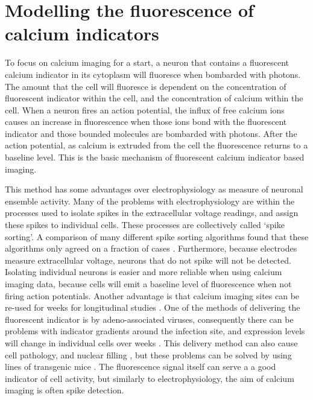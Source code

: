 \section{Modelling the fluorescence of calcium indicators}

To focus on calcium imaging for a start, a neuron that contains a fluorescent calcium indicator in its cytoplasm will fluoresce when bombarded with photons. The amount that the cell will fluoresce is dependent on the concentration of fluorescent indicator within the cell, and the concentration of calcium within the cell. When a neuron fires an action potential, the influx of free calcium ions causes an increase in fluorescence when those ions bond with the fluorescent indicator and those bounded molecules are bombarded with photons. After the action potential, as calcium is extruded from the cell the fluorescence returns to a baseline level. This is the basic mechanism of fluorescent calcium indicator based imaging.

This method has some advantages over electrophysiology as measure of neuronal ensemble activity. Many of the problems with electrophysiology are within the processes used to isolate spikes in the extracellular voltage readings, and assign these spikes to individual cells. These processes are collectively called `spike sorting'. A comparison of many different spike sorting algorithms found that these algorithms only agreed on a fraction of cases \parencite{buccino}. Furthermore, because electrodes measure extracellular voltage, neurons that do not spike will not be detected. Isolating individual neurons is easier and more reliable when using calcium imaging data, because cells will emit a baseline level of fluorescence when not firing action potentials. Another advantage is that calcium imaging sites can be re-used for weeks for longitudinal studies \parencite{chen}. One of the methods of delivering the fluorescent indicator is by adeno-associated viruses, consequently there can be problems with indicator gradients around the infection site, and expression levels will change in individual cells over weeks \parencite{tian, chen}. This delivery method can also cause cell pathology, and nuclear filling \parencite{zariwala}, but these problems can be solved by using lines of transgenic mice \parencite{dana}. The fluorescence signal itself can serve a a good indicator of cell activity, but similarly to electrophysiology, the aim of calcium imaging is often spike detection.

